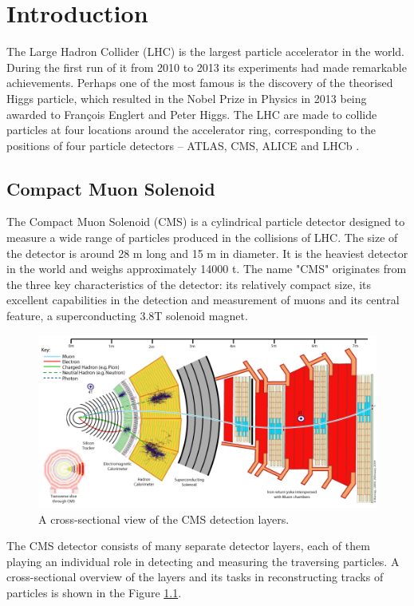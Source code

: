 \chapter{Introduction}


The Large Hadron Collider (LHC) is the largest particle accelerator in the world. During the first run of it from 2010 to 2013 its experiments had made remarkable achievements. Perhaps one of the most famous is the discovery of the theorised Higgs particle, which resulted in the Nobel Prize in Physics in 2013 being awarded to François Englert and Peter Higgs. The LHC are made to collide particles at four locations around the accelerator ring, corresponding to the positions of four particle detectors – ATLAS, CMS, ALICE and LHCb \cite{ref_cern_home}.


\section{Compact Muon Solenoid}


The Compact Muon Solenoid (CMS) is a cylindrical particle detector designed to measure a wide range of particles produced in the collisions of LHC. The size of the detector is around 28 m long and 15 m in diameter. It is the heaviest detector in the world and weighs approximately 14000 t. The name "CMS" originates from the three key characteristics of the detector: its relatively compact size, its excellent capabilities in the detection and measurement of muons and its central feature, a superconducting 3.8T solenoid magnet.

\begin{figure}[ht]\centering
\includegraphics[width=0.9\linewidth]{Data/Introduction/CMS_layers.png}
\caption{A cross-sectional view of the CMS detection layers.}
\label{fig:cms_layers}
\end{figure}

The CMS detector consists of many separate detector layers, each of them playing an individual role in detecting and measuring the traversing particles. A cross-sectional overview of the layers and its tasks in reconstructing tracks of particles is shown in the Figure \ref{fig:cms_layers}.

